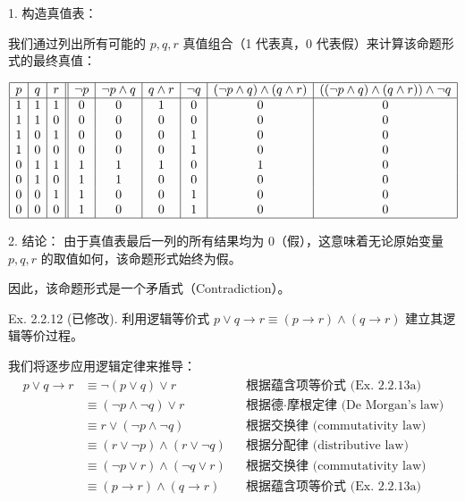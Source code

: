 \begin{questions}
\begin{solution}
1. 构造真值表：

我们通过列出所有可能的 $p, q, r$ 真值组合（1 代表真，0 代表假）来计算该命题形式的最终真值：

\[
\begin{array}{|c|c|c||c|c|c|c|c|c|}
\hline
p & q & r & \neg p & \neg p \wedge q & q \wedge r & \neg q & (\neg p \wedge q) \wedge (q \wedge r) & ((\neg p \wedge q) \wedge (q \wedge r)) \wedge \neg q \\
\hline
1 & 1 & 1 & 0 & 0 & 1 & 0 & 0 & 0 \\
1 & 1 & 0 & 0 & 0 & 0 & 0 & 0 & 0 \\
1 & 0 & 1 & 0 & 0 & 0 & 1 & 0 & 0 \\
1 & 0 & 0 & 0 & 0 & 0 & 1 & 0 & 0 \\
0 & 1 & 1 & 1 & 1 & 1 & 0 & 1 & 0 \\
0 & 1 & 0 & 1 & 1 & 0 & 0 & 0 & 0 \\
0 & 0 & 1 & 1 & 0 & 0 & 1 & 0 & 0 \\
0 & 0 & 0 & 1 & 0 & 0 & 1 & 0 & 0 \\
\hline
\end{array}
\]

2. 结论：
由于真值表最后一列的所有结果均为 $0$（假），这意味着无论原始变量 $p, q, r$ 的取值如何，该命题形式始终为假。

因此，该命题形式是一个矛盾式（Contradiction）。
\end{solution}

\question
Ex. 2.2.12 (已修改). 
利用逻辑等价式 $p \lor q \to r \equiv (p \to r) \wedge (q \to r)$ 建立其逻辑等价过程。
\begin{solution}

我们将逐步应用逻辑定律来推导：
\begin{align}
p \lor q \to r &\equiv \neg(p \lor q) \lor r && \text{根据蕴含项等价式 (Ex. 2.2.13a)} \\
&\equiv (\neg p \wedge \neg q) \lor r && \text{根据德·摩根定律 (De Morgan's law)} \\
&\equiv r \lor (\neg p \wedge \neg q) && \text{根据交换律 (commutativity law)} \\
&\equiv (r \lor \neg p) \wedge (r \lor \neg q) && \text{根据分配律 (distributive law)} \\
&\equiv (\neg p \lor r) \wedge (\neg q \lor r) && \text{根据交换律 (commutativity law)} \\
&\equiv (p \to r) \wedge (q \to r) && \text{根据蕴含项等价式 (Ex. 2.2.13a)}
\end{align}


\end{solution}
\end{questions}
